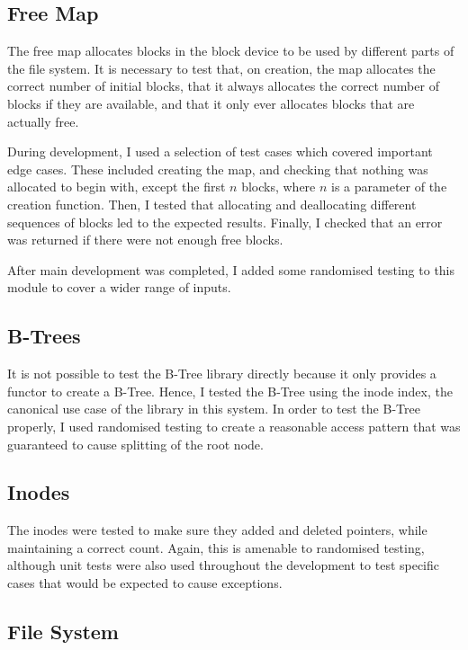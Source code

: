 \documentclass[12pt,a4paper,twoside,openright]{report}
\begin{document}
\subsection{Free Map}

The free map allocates blocks in the block device to be used by different parts of the file system. It is necessary to test that, on creation, the map allocates the correct number of initial blocks, that it always allocates the correct number of blocks if they are available, and that it only ever allocates blocks that are actually free.

During development, I used a selection of test cases which covered important edge cases. These included creating the map, and checking that nothing was allocated to begin with, except the first $n$ blocks, where $n$ is a parameter of the creation function. Then, I tested that allocating and deallocating different sequences of blocks led to the expected results. Finally, I checked that an error was returned if there were not enough free blocks.

After main development was completed, I added some randomised testing to this module to cover a wider range of inputs.

\subsection{B-Trees}

It is not possible to test the B-Tree library directly because it only provides a functor to create a B-Tree. Hence, I tested the B-Tree using the inode index, the canonical use case of the library in this system. In order to test the B-Tree properly, I used randomised testing to create a reasonable access pattern that was guaranteed to cause splitting of the root node.

\subsection{Inodes}

The inodes were tested to make sure they  added and deleted pointers, while maintaining a correct count. Again, this is amenable to randomised testing, although unit tests were also used throughout the development to test specific cases that would be expected to cause exceptions.

\subsection{File System}
\end{document}
